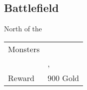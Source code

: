 \subsection{Battlefield}
\label{map:battlefield_12}

North of the 

\noindent\begin{tabularx}{\textwidth}[l]{lX}
	Monsters
	& \nameref{monster:jelly} \\
	& \nameref{monster:jelly}, \nameref{monster:jelly}
\\ \hline
	Reward & 900 Gold
\end{tabularx}
